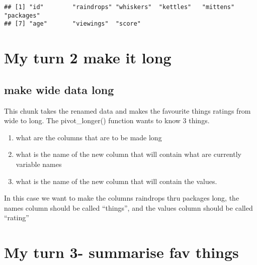 \documentclass[]{article}
\newenvironment{Shaded}{\begin{snugshade}}{\end{snugshade}}
\newcommand{\DataTypeTok}[1]{\textcolor[rgb]{0.13,0.29,0.53}{#1}}
\newcommand{\KeywordTok}[1]{\textcolor[rgb]{0.13,0.29,0.53}{\textbf{#1}}}
\newcommand{\NormalTok}[1]{#1}
\newcommand{\OperatorTok}[1]{\textcolor[rgb]{0.81,0.36,0.00}{\textbf{#1}}}
\newcommand{\StringTok}[1]{\textcolor[rgb]{0.31,0.60,0.02}{#1}}
\providecommand{\tightlist}{%
  \setlength{\itemsep}{0pt}\setlength{\parskip}{0pt}}
\begin{document}
\begin{verbatim}
## [1] "id"        "raindrops" "whiskers"  "kettles"   "mittens"   "packages" 
## [7] "age"       "viewings"  "score"
\end{verbatim}

\hypertarget{my-turn-2-make-it-long}{%
\section{My turn 2 make it long}\label{my-turn-2-make-it-long}}

\hypertarget{make-wide-data-long}{%
\subsection{make wide data long}\label{make-wide-data-long}}

This chunk takes the renamed data and makes the favourite things ratings
from wide to long. The pivot\_longer() function wants to know 3 things.

\begin{enumerate}
\def\labelenumi{\arabic{enumi}.}
\tightlist
\item
  what are the columns that are to be made long
\item
  what is the name of the new column that will contain what are
  currently variable names
\item
  what is the name of the new column that will contain the values.
\end{enumerate}

In this case we want to make the columns raindrops thru packages long,
the names column should be called ``things'', and the values column
should be called ``rating''

\begin{Shaded}
\end{Shaded}

\hypertarget{my-turn-3--summarise-fav-things}{%
\section{My turn 3- summarise fav
things}\label{my-turn-3--summarise-fav-things}}
\end{document}

